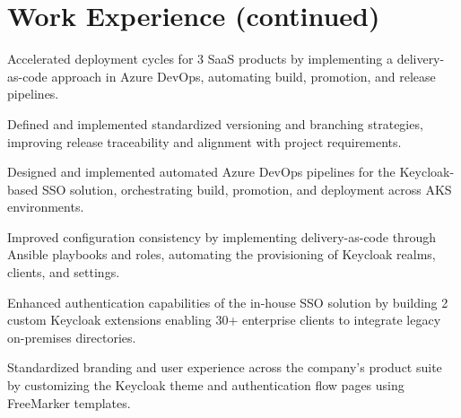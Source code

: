 \documentclass[11pt]{deedy-resume-openfont}
\begin{document}
\section{Work Experience (continued)}
\sectionsepsmall
{}\hfill {}
\begin{tightemize}
	\item Accelerated deployment cycles for 3 SaaS products by implementing a delivery-as-code approach in Azure DevOps, automating build, promotion, and release pipelines.
	\item Defined and implemented standardized versioning and branching strategies, improving release traceability and alignment with project requirements.
\end{tightemize}
\sectionsep
{}
\sectionsep
%
%
\hfill {}
\begin{tightemize}
	\item Designed and implemented automated Azure DevOps pipelines for the Keycloak-based SSO solution, orchestrating build, promotion, and deployment across AKS environments.
	\item Improved configuration consistency by implementing delivery-as-code through Ansible playbooks and roles, automating the provisioning of Keycloak realms, clients, and settings.
	\item Enhanced authentication capabilities of the in-house SSO solution by building 2 custom Keycloak extensions enabling 30+ enterprise clients to integrate legacy on-premises directories.
	\item Standardized branding and user experience across the company's product suite by customizing the Keycloak theme and authentication flow pages using FreeMarker templates.
\end{tightemize}
\sectionsep
{}
%
%
\vspace{0.5cm}
\end{document}
